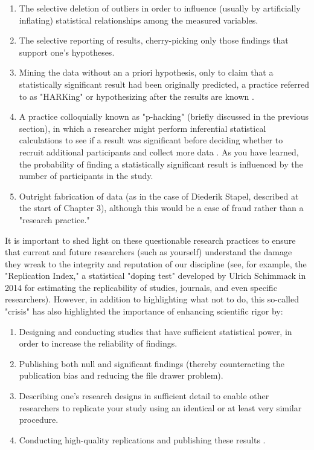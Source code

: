 \begin{enumerate}
\item The selective deletion of outliers in order to influence (usually by artificially inflating) statistical relationships among the measured variables.

\item The selective reporting of results, cherry-picking only those findings that support one's hypotheses. 
\item Mining the data without an a priori hypothesis, only to claim that a statistically significant result had been originally predicted, a practice referred to as "HARKing" or hypothesizing after the results are known \citep{kerr_harking:_1998}.

\item A practice colloquially known as "p-hacking" (briefly discussed in the previous section), in which a researcher might perform inferential statistical calculations to see if a result was significant before deciding whether to recruit additional participants and collect more data \citep{head_extent_2015}. As you have learned, the probability of finding a statistically significant result is influenced by the number of participants in the study.

\item Outright fabrication of data (as in the case of Diederik Stapel, described at the start of Chapter 3), although this would be a case of fraud rather than a "research practice."

\end{enumerate}

It is important to shed light on these questionable research practices to ensure that current and future researchers (such as yourself) understand the damage they wreak to the integrity and reputation of our discipline (see, for example, the "Replication Index," a statistical "doping test" developed by Ulrich Schimmack in 2014 for estimating the replicability of studies, journals, and even specific researchers). However, in addition to highlighting what not to do, this so-called "crisis" has also highlighted the importance of enhancing scientific rigor by:


\begin{enumerate}
\item Designing and conducting studies that have sufficient statistical power, in order to increase the reliability of findings.

\item Publishing both null and significant findings (thereby counteracting the publication bias and reducing the file drawer problem).

\item Describing one's research designs in sufficient detail to enable other researchers to replicate your study using an identical or at least very similar procedure.

\item Conducting high-quality replications and publishing these results \citep{brandt_replication_2014}.

\end{enumerate}

